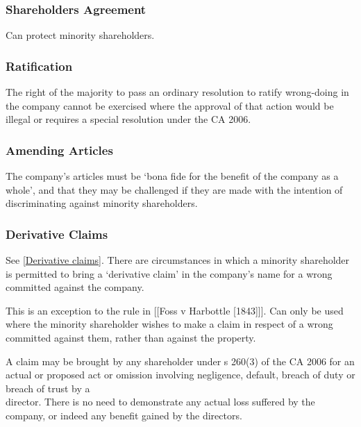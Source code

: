 \documentclass[
]{article}
\newenvironment{Shaded}{}{}
\newcommand{\NormalTok}[1]{#1}
\begin{document}
\hypertarget{shareholders-agreement-1}{%
\subsubsection{Shareholders Agreement}\label{shareholders-agreement-1}}

Can protect minority shareholders.

\hypertarget{ratification}{%
\subsubsection{Ratification}\label{ratification}}

The right of the majority to pass an ordinary resolution to ratify
wrong-doing in the company cannot be exercised where the approval of
that action would be illegal or requires a special resolution under the
CA 2006.

\hypertarget{amending-articles-1}{%
\subsubsection{Amending Articles}\label{amending-articles-1}}

The company's articles must be `bona fide for the benefit of the company
as a whole', and that they may be challenged if they are made with the
intention of discriminating against minority shareholders.

\hypertarget{derivative-claims}{%
\subsubsection{Derivative Claims}\label{derivative-claims}}

See {[}\protect\hyperlink{derivative-claims}{Derivative claims}{]}.
There are circumstances in which a minority shareholder is permitted to
bring a `derivative claim' in the company's name for a wrong committed
against the company.

\begin{Shaded}
\begin{Highlighting}[]
\NormalTok{This is an exception to the rule in [[Foss v Harbottle [1843]]]. Can only be used where the minority shareholder wishes to make a claim in respect of a wrong committed against them, rather than against the property. }
\end{Highlighting}
\end{Shaded}

A claim may be brought by any shareholder under s 260(3) of the CA 2006
for an actual or proposed act or omission involving negligence, default,
breach of duty or breach of trust by a\\
director. There is no need to demonstrate any actual loss suffered by
the company, or indeed any benefit gained by the directors.
\end{document}
